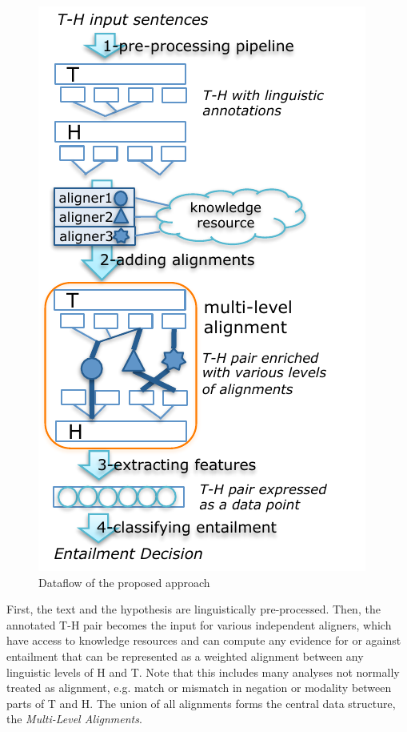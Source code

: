 \documentclass[11pt,letterpaper]{article}
\begin{document}
\begin{figure}[t!b]
  \centering
  \includegraphics[width=0.9\columnwidth]{figures/figure1.pdf}
  \caption{Dataflow of the proposed approach}
  \label{fig:1}
\end{figure}

First, the text and the hypothesis are linguistically
pre-processed. Then, the annotated T-H pair becomes the input for
various independent aligners, which have access to knowledge resources
and can compute any evidence for or against entailment that can be
represented as a weighted alignment between any linguistic levels of H
and T.
Note that this includes many analyses not normally treated as
alignment, e.g. match or mismatch in negation or modality between
parts of T and H. %
The union of all alignments forms the 
central data structure, the {\em Multi-Level Alignments}.
\end{document}
